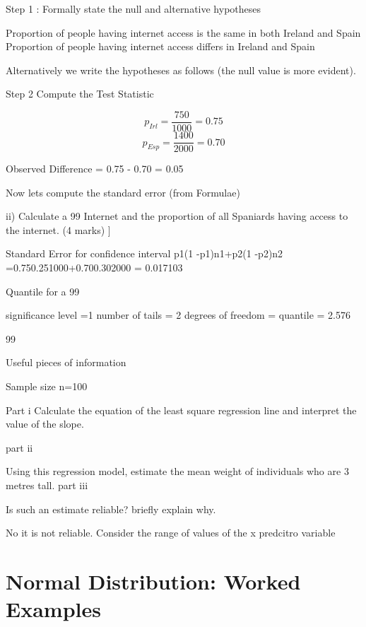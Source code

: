 \documentclass[12pt]{report}
\begin{document}
{Step 1 : Formally state the null and alternative hypotheses

Proportion of people having internet access is the same in both Ireland and Spain
Proportion of people having internet access differs in Ireland and Spain


Alternatively we write the hypotheses as follows (the null value is more evident).




Step 2 Compute the Test Statistic

\[p_{Irl}= \frac{750}{1000}= 0.75\] 
\[p_{Esp}= \frac{1400}{2000}= 0.70\]

Observed Difference = 0.75 - 0.70 = 0.05  

Now lets compute the standard error (from Formulae)


ii)      Calculate a 99%
Internet and the proportion of all Spaniards having access to the internet.  (4 marks)
]

Standard Error for confidence interval	p1(1 -p1)n1+p2(1 -p2)n2	=0.750.251000+0.700.302000     =  0.017103



Quantile for a 99%

significance level  =1%
number of tails = 2
degrees of freedom = 
quantile = 2.576 


99%



Useful pieces of information


Sample size  n=100




Part i
Calculate the equation of the least square regression line and interpret the value of the slope.

part ii

Using this regression model, estimate the mean weight of individuals who are 3 metres tall.
part iii

Is such an estimate reliable?  briefly explain why.

No it is not reliable. Consider the range of values of the x predcitro variable



\section{Normal Distribution: Worked Examples}

}
\end{document}
